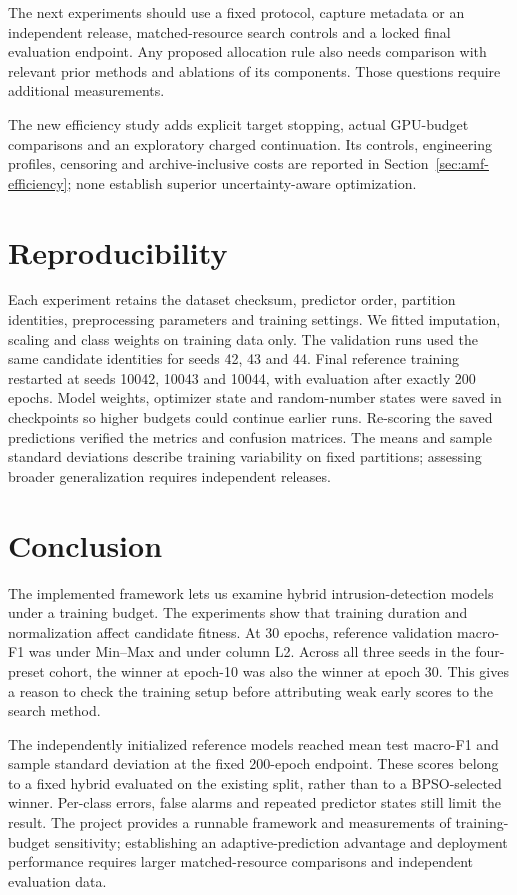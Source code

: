 The next experiments should use a fixed protocol, capture metadata or an independent release, matched-resource search controls and a locked final evaluation endpoint. Any proposed allocation rule also needs comparison with relevant prior methods and ablations of its components. Those questions require additional measurements.

The new efficiency study adds explicit target stopping, actual GPU-budget comparisons and an exploratory charged continuation. Its controls, engineering profiles, censoring and archive-inclusive costs are reported in Section~\ref{sec:amf-efficiency}; none establish superior uncertainty-aware optimization.

\section{Reproducibility}
Each experiment retains the dataset checksum, predictor order, partition identities, preprocessing parameters and training settings. We fitted imputation, scaling and class weights on training data only. The validation runs used the same candidate identities for seeds 42, 43 and 44. Final reference training restarted at seeds 10042, 10043 and 10044, with evaluation after exactly 200 epochs. Model weights, optimizer state and random-number states were saved in checkpoints so higher budgets could continue earlier runs. Re-scoring the saved predictions verified the metrics and confusion matrices. The means and sample standard deviations describe training variability on fixed partitions; assessing broader generalization requires independent releases.

\section{Conclusion}
The implemented framework lets us examine hybrid intrusion-detection models under a training budget. The experiments show that training duration and normalization affect candidate fitness. At 30 epochs, reference validation macro-F1 was \ExtMinmaxThirty{} under Min--Max and \ExtColumnThirty{} under column L2. Across all three seeds in the four-preset cohort, the winner at epoch-10 was also the winner at epoch 30. This gives a reason to check the training setup before attributing weak early scores to the search method.

The independently initialized reference models reached mean test macro-F1 \FinalTestFOne{} and sample standard deviation \FinalTestFOneSD{} at the fixed 200-epoch endpoint. These scores belong to a fixed hybrid evaluated on the existing split, rather than to a BPSO-selected winner. Per-class errors, false alarms and repeated predictor states still limit the result. The project provides a runnable framework and measurements of training-budget sensitivity; establishing an adaptive-prediction advantage and deployment performance requires larger matched-resource comparisons and independent evaluation data.

